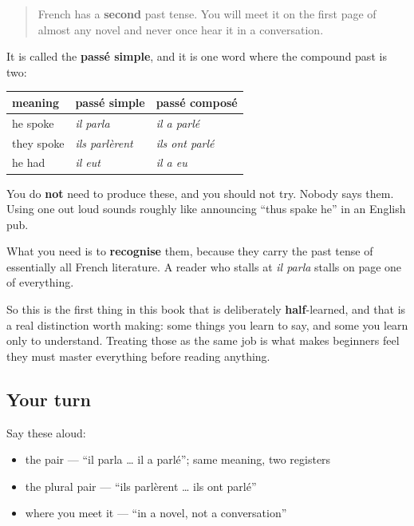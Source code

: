\label{lesson:FR-C15-passe-simple}



\begin{quote}
French has a \textbf{second} past tense. You will meet it on the first page of almost any novel and never once hear it in a conversation.
\end{quote}

\begin{grammarlens}[title={Grammar Lens: recognise it, do not produce it}]
It is called the \textbf{passé simple}, and it is one word where the compound past is two:

\noindent
\begin{tabularx}{\linewidth}{@{}>{\raggedright\arraybackslash}X>{\raggedright\arraybackslash}X>{\raggedright\arraybackslash}X@{}}
\toprule
\textbf{meaning} & \textbf{passé simple} & \textbf{passé composé} \\
\midrule
he spoke & \emph{il parla} & \emph{il a parlé} \\
they spoke & \emph{ils parlèrent} & \emph{ils ont parlé} \\
he had & \emph{il eut} & \emph{il a eu} \\
\bottomrule
\end{tabularx}

You do \textbf{not} need to produce these, and you should not try. Nobody says them. Using one out loud sounds roughly like announcing \textquotedblleft{}thus spake he\textquotedblright{} in an English pub.

What you need is to \textbf{recognise} them, because they carry the past tense of essentially all French literature. A reader who stalls at \emph{il parla} stalls on page one of everything.

So this is the first thing in this book that is deliberately \textbf{half}-learned, and that is a real distinction worth making: some things you learn to say, and some you learn only to understand. Treating those as the same job is what makes beginners feel they must master everything before reading anything.
\end{grammarlens}

\subsection*{Your turn}
Say these aloud:

\begin{itemize}
\raggedright
  \item the pair — \textquotedblleft{}il parla … il a parlé\textquotedblright{}; same meaning, two registers
  \item the plural pair — \textquotedblleft{}ils parlèrent … ils ont parlé\textquotedblright{}
  \item where you meet it — \textquotedblleft{}in a novel, not a conversation\textquotedblright{}
\end{itemize}

